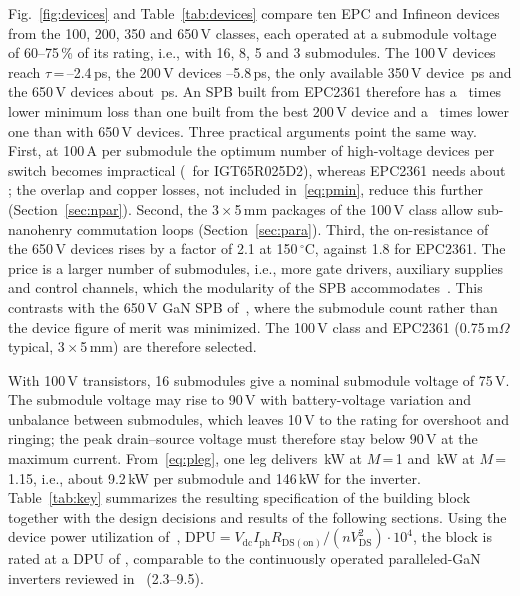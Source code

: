 \documentclass[conference]{IEEEtran}
\begin{document}
Fig.~\ref{fig:devices} and Table~\ref{tab:devices} compare ten EPC and Infineon devices from the 100, 200, 350 and 650\,V classes, each operated at a submodule voltage of 60--75\,\% of its rating, i.e., with 16, 8, 5 and 3 submodules. The 100\,V devices reach $\tau$\,=\,\TauEPC--2.4\,ps, the 200\,V devices \TauBestTwo--5.8\,ps, the only available 350\,V device \TauBestThree\,ps and the 650\,V devices about \TauBestSix\,ps. An SPB built from EPC2361 therefore has a \PminTwo\ times lower minimum loss than one built from the best 200\,V device and a \PminSix\ times lower one than with 650\,V devices. Three practical arguments point the same way. First, at 100\,A per submodule the optimum number of high-voltage devices per switch becomes impractical (\NoptIGT\ for IGT65R025D2), whereas EPC2361 needs about \NoptEPC; the overlap and copper losses, not included in~\eqref{eq:pmin}, reduce this further (Section~\ref{sec:npar}). Second, the 3\,$\times$\,5\,mm packages of the 100\,V class allow sub-nanohenry commutation loops (Section~\ref{sec:para}). Third, the on-resistance of the 650\,V devices rises by a factor of 2.1 at 150\,$^\circ$C, against 1.8 for EPC2361. The price is a larger number of submodules, i.e., more gate drivers, auxiliary supplies and control channels, which the modularity of the SPB accommodates~\cite{jin2017}. This contrasts with the 650\,V GaN SPB of~\cite{rohner2024}, where the submodule count rather than the device figure of merit was minimized. The 100\,V class and EPC2361 (0.75\,m$\Omega$ typical, 3\,$\times$\,5\,mm) are therefore selected.

With 100\,V transistors, 16 submodules give a nominal submodule voltage of 75\,V. The submodule voltage may rise to 90\,V with battery-voltage variation and unbalance between submodules, which leaves 10\,V to the rating for overshoot and ringing; the peak drain--source voltage must therefore stay below 90\,V at the maximum current. From~\eqref{eq:pleg}, one leg delivers \Prated\,kW at $M$\,=\,1 and \Pmax\,kW at $M$\,=\,1.15, i.e., about 9.2\,kW per submodule and 146\,kW for the inverter. Table~\ref{tab:key} summarizes the resulting specification of the building block together with the design decisions and results of the following sections. Using the device power utilization of~\cite{cooke2026}, $\mathrm{DPU}=V_\mathrm{dc}I_\mathrm{ph}R_\mathrm{DS(on)}/(nV_\mathrm{DS}^2)\cdot10^4$, the block is rated at a DPU of \DpuMax{}, comparable to the continuously operated paralleled-GaN inverters reviewed in~\cite{cooke2026} (2.3--9.5).
\end{document}
